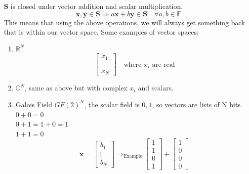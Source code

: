 \documentclass[12pt]{article}
\begin{document}
$\textbf{S}$ is closed under vector addition and scalar multiplication. 
\begin{equation}
    \boxed{\textbf{x}, \textbf{y} \in \textbf{S} \Rightarrow a\textbf{x} + b \textbf{y} \in \textbf{S} \quad \forall a,b \in \mathbb{F}}
\end{equation}
This means that using the above operations, we will always get something back that is within our vector space.
Some examples of vector spaces:
\begin{enumerate}
    \item $\mathbb{R}^N$
    \begin{equation*}   
        \begin{bmatrix}
            x_1 \\
            \vdots \\
            x_N
        \end{bmatrix}
        \quad \text{where $x_i$ are real}
    \end{equation*}
    \item $\mathbb{C}^N$, same as above but with complex $x_i$ and scalars. 
    \item Galois Field $GF(2)^N$, the scalar field is ${0, 1}$, so vectors are lists of N bits.
    \\
    $0 + 0 = 0$\\
    $0 + 1 = 1 + 0 = 1$\\
    $1 + 1 = 0$\\
    \begin{equation*} 
        \textbf{x} = 
        \begin{bmatrix}
            b_1 \\
            \vdots \\
            b_N
        \end{bmatrix}
        \Rightarrow_{\text{Example}}
        \begin{bmatrix}
            1 \\
            1 \\
            0 \\
            1
        \end{bmatrix}
        +
        \begin{bmatrix}
            1 \\
            0 \\
            0 \\
            0
        \end{bmatrix}

\end{equation*}
\end{enumerate}
\end{document}
